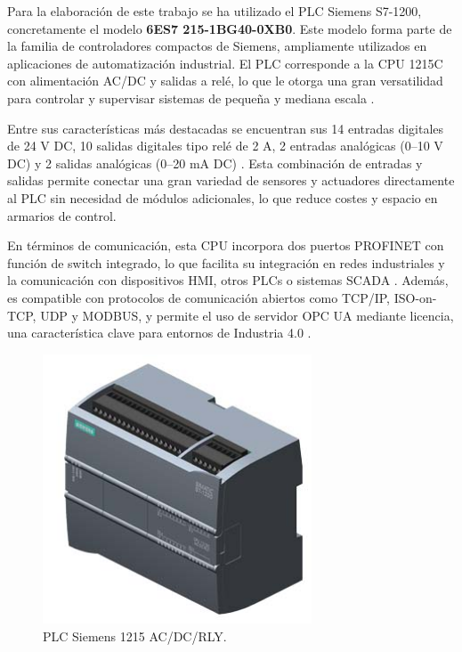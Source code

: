 Para la elaboración de este trabajo se ha utilizado el PLC Siemens S7-1200, concretamente el modelo \textbf{6ES7 215-1BG40-0XB0}. Este modelo forma parte de la familia de controladores compactos de Siemens, ampliamente utilizados en aplicaciones de automatización industrial. El PLC corresponde a la CPU 1215C con alimentación AC/DC y salidas a relé, lo que le otorga una gran versatilidad para controlar y supervisar sistemas de pequeña y mediana escala \cite{PLC_siemens}.

Entre sus características más destacadas se encuentran sus 14 entradas digitales de 24 V DC, 10 salidas digitales tipo relé de 2 A, 2 entradas analógicas (0–10 V DC) y 2 salidas analógicas (0–20 mA DC) \cite{PLC_siemens}. Esta combinación de entradas y salidas permite conectar una gran variedad de sensores y actuadores directamente al PLC sin necesidad de módulos adicionales, lo que reduce costes y espacio en armarios de control.

En términos de comunicación, esta CPU incorpora dos puertos PROFINET con función de switch integrado, lo que facilita su integración en redes industriales y la comunicación con dispositivos HMI, otros PLCs o sistemas SCADA \cite{PLC_siemens}. Además, es compatible con protocolos de comunicación abiertos como TCP/IP, ISO-on-TCP, UDP y MODBUS, y permite el uso de servidor OPC UA mediante licencia, una característica clave para entornos de Industria 4.0 \cite{PLC_siemens}.

\begin{figure} [h!]
  \begin{center}
    \includegraphics[width=8cm]{figs/PLC_siemens}
  \end{center}
  \caption{\centering PLC Siemens 1215 AC/DC/RLY. \cite{PLC_siemens}}
  \label{fig:PLC_siemens}
\end{figure} 

